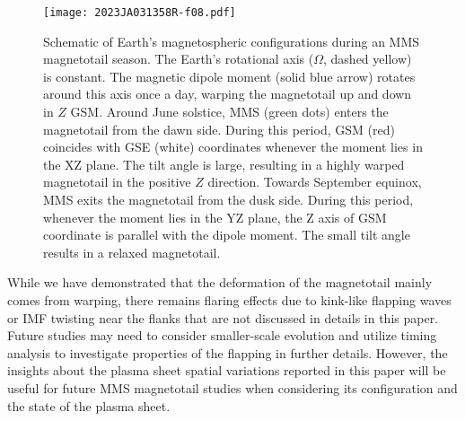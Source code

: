 \documentclass[draft]{agujournal2019}
\begin{document}
\begin{figure}
\centering
\noindent\texttt{[image: 2023JA031358R-f08.pdf]}
\caption{
    Schematic of Earth's magnetospheric configurations during an MMS magnetotail season. The Earth's rotational axis ($\Omega$, dashed yellow) is constant. The magnetic dipole moment (solid blue arrow) rotates around this axis once a day, warping the magnetotail up and down in $Z$ GSM. Around June solstice, MMS (green dots) enters the magnetotail from the dawn side. During this period, GSM (red) coincides with GSE (white) coordinates whenever the moment lies in the XZ plane. The tilt angle is large, resulting in a highly warped magnetotail in the positive $Z$ direction. Towards September equinox, MMS exits the magnetotail from the dusk side. During this period, whenever the moment lies in the YZ plane, the Z axis of GSM coordinate is parallel with the dipole moment. The small tilt angle results in a relaxed magnetotail.
}
\label{fig:sketch}
\end{figure}

While we have demonstrated that the deformation of the magnetotail mainly comes from warping, there remains flaring effects due to kink-like flapping waves or IMF twisting near the flanks that are not discussed in details in this paper. Future studies may need to consider smaller-scale evolution and utilize timing analysis to investigate properties of the flapping in further details. However, the insights about the plasma sheet spatial variations reported in this paper will be useful for future MMS magnetotail studies when considering its configuration and the state of the plasma sheet.
\end{document}
